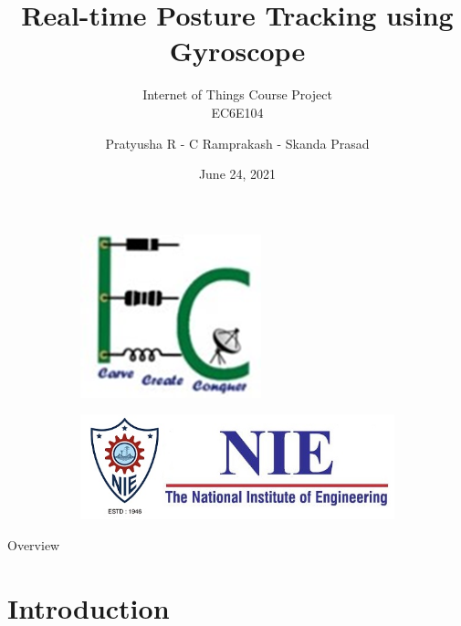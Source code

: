 \documentclass[aspectratio=169,xcolor=dvipsnames]{beamer}
\title{Real-time Posture Tracking using Gyroscope}
\subtitle{Internet of Things Course Project \\ EC6E104}
\author[Pin-Yen]{Pratyusha R - C Ramprakash - Skanda Prasad}
\institute %
{
    Department of Electronics and Communication Engineering

    6th Semester, A Section
    \vskip 3pt
}
\date{June 24, 2021} %
\begin{document}
\begin{frame}
    \begin{figure}
     \centering
     \begin{subfigure}[b]{0.49\textwidth}
         \centering
         \includegraphics[scale=0.35]{ecelogo.png}
     \end{subfigure}
     \hfill
     \begin{subfigure}[b]{0.49\textwidth}
         \centering
         \includegraphics[scale=0.35]{New_NIE_Logo.png}
     \end{subfigure}
     \end{figure}
    \titlepage
\end{frame}

\begin{frame}{Overview}
    \tableofcontents
\end{frame}

\section{Introduction}
\end{document}
